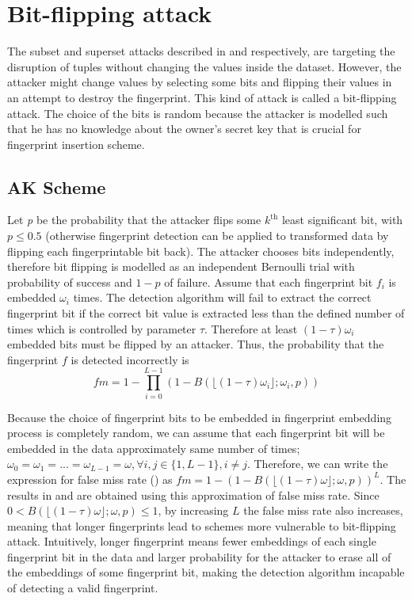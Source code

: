 \section{Bit-flipping attack}
The subset and superset attacks described in  and  respectively, are targeting the disruption of tuples without changing the values inside the dataset. 
However, the attacker might change values by selecting some bits and flipping their values in an attempt to destroy the fingerprint.
This kind of attack is called a bit-flipping attack.
The choice of the bits is random because the attacker is modelled such that he has no knowledge about the owner's secret key that is crucial for fingerprint insertion scheme.

\subsection{AK Scheme}
Let \textit{p} be the probability that the attacker flips some $k^{\text{th}}$ least significant bit, with $p \leq 0.5$ (otherwise fingerprint detection can be applied to transformed data by flipping each fingerprintable bit back). 
The attacker chooses bits independently, therefore bit flipping is modelled as an independent Bernoulli trial with probability  of success and $1-p$ of failure. 
Assume that each fingerprint bit $f_i$ is embedded $\omega_i$ times.
The detection algorithm will fail to extract the correct fingerprint bit if the correct bit value is extracted less than the defined number of times which is controlled by parameter $\tau$.
Therefore at least $(1-\tau)\omega_i$ embedded bits must be flipped by an attacker.
Thus, the probability that the fingerprint $f$ is detected incorrectly is
\begin{equation}\label{eq:fm-bit-flipping-ak}
    fm=1-\prod_{i=0}^{L-1}(1-B(\lfloor(1-\tau)\omega_i\rfloor;\omega_i,p))
\end{equation}

Because the choice of fingerprint bits to be embedded in fingerprint embedding process is completely random, we can assume that each fingerprint bit will be embedded in the data approximately same number of times; $\omega_0=\omega_1=...=\omega_{L-1}=\omega, \forall i, j \in \{1,L-1\}, i\neq j$.
Therefore, we can write the expression for false miss rate () as $fm = 1 - (1-B(\lfloor(1-\tau)\omega\rfloor;\omega,p))^L$.
The results in  and  are obtained using this approximation of false miss rate. 
Since $0<B(\lfloor(1-\tau)\omega\rfloor;\omega,p)\leq1$, by increasing $L$ the false miss rate also increases, meaning that longer fingerprints lead to schemes more vulnerable to bit-flipping attack.
Intuitively, longer fingerprint means fewer embeddings of each single fingerprint bit in the data and larger probability for the attacker to erase all of the embeddings of some fingerprint bit, making the detection algorithm incapable of detecting a valid fingerprint. 

